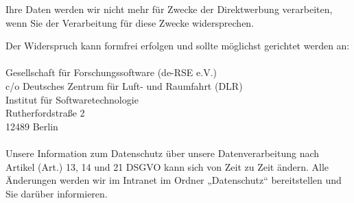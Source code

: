 \documentclass[a4paper, fontsize=11pt]{scrartcl}
\begin{document}
\begin{enumerate}[label=\textbf{\arabic*.},ref=\arabic*]
\begin{enumerate}[label=\textbf{\arabic*.}]
    Ihre Daten werden wir nicht mehr für Zwecke der Direktwerbung verarbeiten, wenn Sie der Verarbeitung für diese Zwecke widersprechen.
  \end{enumerate} 
  \vspace{0.5cm}
  Der Widerspruch kann formfrei erfolgen und sollte möglichst gerichtet werden an: \\\\
  Gesellschaft für Forschungssoftware (de-RSE e.V.) \\
  c/o Deutsches Zentrum für Luft- und Raumfahrt (DLR) \\
  Institut für Softwaretechnologie \\
  Rutherfordstraße 2 \\
  12489 Berlin \\\\
  Unsere Information zum Datenschutz über unsere Datenverarbeitung nach Artikel (Art.) 13, 14 und 21 DSGVO kann sich von Zeit zu Zeit ändern. Alle Änderungen werden wir im Intranet im Ordner „Datenschutz“ bereitstellen und Sie darüber informieren.
\end{enumerate}
\end{document}
